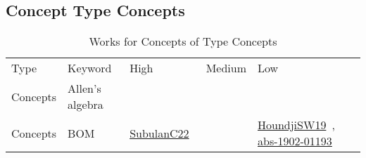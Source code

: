 \clearpage
\subsection{Concept Type Concepts}
\label{sec:Concepts}
{\scriptsize
\begin{longtable}{lp{3cm}>{\raggedright\arraybackslash}p{6cm}>{\raggedright\arraybackslash}p{6cm}>{\raggedright\arraybackslash}p{8cm}}
\rowcolor{white}\caption{Works for Concepts of Type Concepts}\\ \toprule
\rowcolor{white}Type & Keyword & High & Medium & Low\\ \midrule\endhead
\bottomrule
\endfoot
Concepts & Allen's algebra &  &  & \\
Concepts & BOM & \href{works/SubulanC22.pdf}{SubulanC22}~\cite{SubulanC22} &  & \href{works/HoundjiSW19.pdf}{HoundjiSW19}~\cite{HoundjiSW19}, \href{works/abs-1902-01193.pdf}{abs-1902-01193}~\cite{abs-1902-01193}\\

\end{longtable}}
